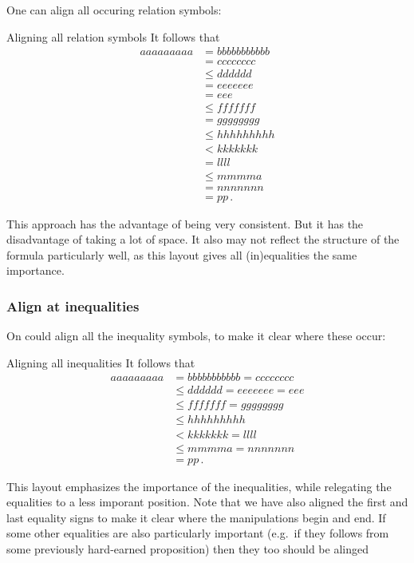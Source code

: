 One can align all occuring relation symbols:
\begin{showlatex}{Aligning all relation symbols}
It follows that
\begin{align*}
  aaaaaaaaa
  &= bbbbbbbbbbb \\
  &= cccccccc \\
  &\leq dddddd \\
  &= eeeeeee \\
  &= eee \\
  &\leq fffffff \\
  &= gggggggg \\
  &\leq hhhhhhhhh \\
  &< kkkkkkk \\
  &= llll \\
  &\leq mmmma \\
  &= nnnnnnn \\
  &= pp \,.
\end{align*}
\end{showlatex}
This approach has the advantage of being very consistent.
But it has the disadvantage of taking a lot of space.
It also may not reflect the structure of the formula particularly well, as this layout gives all (in)equalities the same importance.
    
\subsubsection{Align at inequalities}

On could align all the inequality symbols, to make it clear where these occur:
\begin{showlatex}{Aligning all inequalities}
It follows that
\begin{align*}
  aaaaaaaaa
  &= bbbbbbbbbbb
  = cccccccc
  \\
  &\leq
  dddddd
  = eeeeeee
  = eee
  \\
  &\leq
  fffffff
  = gggggggg
  \\
  &\leq
  hhhhhhhhh
  \\
  &<
  kkkkkkk
  = llll \\
  &\leq mmmma
  = nnnnnnn
  \\
  &= pp \,.
\end{align*}
\end{showlatex}
This layout emphasizes the importance of the inequalities, while relegating the equalities to a less imporant position.
Note that we have also aligned the first and last equality signs to make it clear where the manipulations begin and end.
If some other equalities are also particularly important (e.g.\ if they follows from some previously hard-earned proposition) then they too should be alinged





